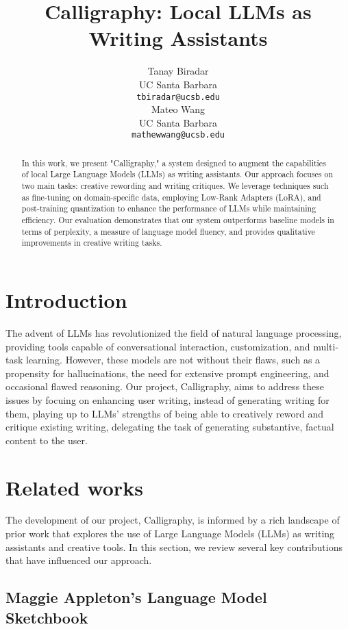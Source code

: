 \documentclass{article}
\title{Calligraphy: Local LLMs as Writing Assistants}
\author{%
  Tanay Biradar\\
  UC Santa Barbara\\
  \texttt{tbiradar@ucsb.edu} \\
  \And
  Mateo Wang\\
  UC Santa Barbara\\
  \texttt{mathewwang@ucsb.edu} \\
}
\begin{document}
\maketitle


\begin{abstract}
  In this work, we present "Calligraphy," a system designed to augment the
  capabilities of local Large Language Models (LLMs) as writing assistants.
  Our approach focuses on two main tasks: creative rewording and writing
  critiques. We leverage techniques such as fine-tuning on domain-specific
  data, employing Low-Rank Adapters (LoRA), and post-training quantization to
  enhance the performance of LLMs while maintaining efficiency. Our
  evaluation demonstrates that our system outperforms baseline models in
  terms of perplexity, a measure of language model fluency, and provides
  qualitative improvements in creative writing tasks.
\end{abstract}


\section{Introduction}


The advent of LLMs has revolutionized the field of natural language processing,
providing tools capable of conversational interaction, customization, and
multi-task learning. However, these models are not without their flaws, such as a
propensity for hallucinations, the need for extensive prompt engineering, and
occasional flawed reasoning. Our project, Calligraphy, aims to address these issues
by focuing on enhancing user writing, instead of generating writing for them,
playing up to LLMs' strengths of being able to creatively reword and critique
existing writing, delegating the task of generating substantive, factual content to
the user.


\section{Related works}
\label{rel_works}

The development of our project, Calligraphy, is informed by a rich landscape of
prior work that explores the use of Large Language Models (LLMs) as writing
assistants and creative tools. In this section, we review several key contributions that have influenced our approach.

\subsection{Maggie Appleton's Language Model Sketchbook}
\end{document}
